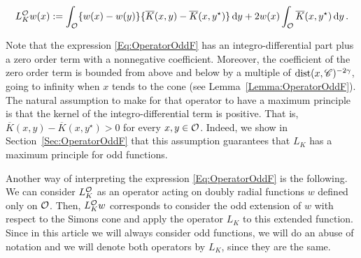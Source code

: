 \begin{equation}
\label{Eq:OperatorOddF}
	L_K^{\mathcal{O}} w (x) := \int_{\mathcal{O}} \{w(x) - w(y) \} \{\overline{K}(x, y) - \overline{K}(x, y^\star)  \} \,\mathrm{d} y +  2 w(x) \int_{\mathcal{O}} \overline{K}(x, y^\star) \,\mathrm{d} y \,.
\end{equation}




Note that the expression \eqref{Eq:OperatorOddF} has an integro-differential part plus a zero order term with a nonnegative coefficient. Moreover, the coefficient of the zero order term is bounded from above and below by a multiple of $\operatorname{dist}(x,\mathscr{C})^{-2\gamma}$, going to infinity when $x$ tends to the cone (see Lemma~\ref{Lemma:OperatorOddF}). The natural assumption to make for that operator to have a maximum principle is that the kernel of the integro-differential term is positive. That is, $\overline{K}(x, y) - \overline{K}(x, y^\star)>0$ for every $x,y\in \mathcal{O}$. Indeed, we show in Section~\ref{Sec:OperatorOddF} that this assumption guarantees that $L_K$ has a maximum principle for odd functions. 

\begin{remark}
	Another way of interpreting the expression \eqref{Eq:OperatorOddF} is the following. We can consider $L_K^{\mathcal{O}}$ as an operator acting on doubly radial functions $w$ defined only on $\mathcal{O}$. Then, $L_K^{\mathcal{O}} w$ corresponds to consider the odd extension of  $w$ with respect to the Simons cone and apply the operator $L_K$ to this extended function. Since in this article we will always consider odd functions, we will do an abuse of notation and we will denote both operators by $L_K$, since they are the same.
\end{remark}

